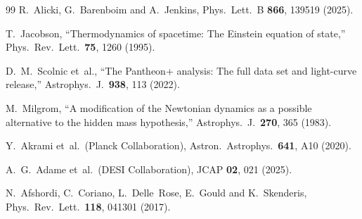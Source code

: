 \documentclass[aps,prd,twocolumn,superscriptaddress,nofootinbib]{revtex4-2}
\begin{document}
\begin{thebibliography}{99}
R.~Alicki, G.~Barenboim and A.~Jenkins,
Phys.\ Lett.\ B \textbf{866}, 139519 (2025).

T.~Jacobson,
``Thermodynamics of spacetime: The Einstein equation of state,''
Phys.\ Rev.\ Lett.\ \textbf{75}, 1260 (1995).

D.~M.~Scolnic et~al.,
``The Pantheon+ analysis: The full data set and light-curve release,''
Astrophys.\ J.\ \textbf{938}, 113 (2022).

M.~Milgrom,
``A modification of the Newtonian dynamics as a possible alternative to the hidden mass hypothesis,''
Astrophys.\ J.\ \textbf{270}, 365 (1983).


Y.~Akrami et~al.\ (Planck Collaboration),
Astron.\ Astrophys.\ \textbf{641}, A10 (2020).

A.~G.~Adame et~al.\ (DESI Collaboration),
JCAP \textbf{02}, 021 (2025).

N.~Afshordi, C.~Coriano, L.~Delle~Rose, E.~Gould and K.~Skenderis,
Phys.\ Rev.\ Lett.\ \textbf{118}, 041301 (2017).

\end{thebibliography}
\end{document}
